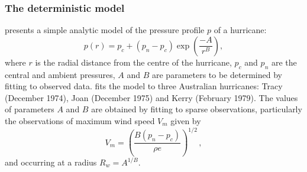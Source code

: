\subsubsection{The deterministic model}

\citet{holland1980} presents a simple analytic model of the pressure profile $p$ of a hurricane:
	\begin{equation}
		p(r) = p_c + (p_n-p_c)\exp\left( \frac{-A}{r^B} \right),
	\label{eqn:TC:hollandmodel}
	\end{equation} 
where $r$ is the radial distance from the centre of the hurricane, $p_c$ and $p_n$ are the central and ambient pressures, $A$ and $B$ are parameters to be determined by fitting to observed data. \cite{holland1980} fits the model to three Australian hurricanes: Tracy (December 1974), Joan (December 1975) and Kerry (February 1979). The values of parameters $A$ and $B$ are obtained by fitting to sparse observations, particularly the observations of maximum wind speed $V_m$ given by
	\begin{equation}
		V_m = \left(\frac{B(p_n-p_c)}{\rho e}\right)^{1/2}\,,
		\label{eqn:TC:model:V_m}
	\end{equation} 
and occurring at a radius $R_w = A^{1/B}$. 

